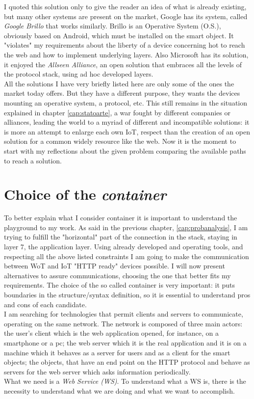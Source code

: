 I quoted this solution only to give the reader an idea of what is already existing, but many other systems are present on the market, Google has its system, called \textit{Google Brillo} that works similarly. Brillo is an Operative System (O.S.), obviously based on Android, which must be installed on the smart object. It "violates" my requirements about the liberty of a device concerning hot to reach the web and how to implement underlying layers. Also Microsoft has its solution, it enjoyed the \textit{Allseen Alliance}, an open solution that embraces all the levels of the protocol stack, using ad hoc developed layers. \\
All the solutions I have very briefly listed here are only some of the ones the market today offers. But they have a different purpose, they wants the devices mounting an operative system, a protocol, etc. This still remains in the situation explained in chapter \ref{cap:statoarte}, a war fought by different companies or alliances, leading the world to a myriad of different and incompatible solutions: it is more an attempt to enlarge each own IoT, respect than the creation of an open solution for a common widely resource like the web. Now it is the moment to start with my reflections about the given problem comparing the available paths to reach a solution.  


\section{Choice of the \textit{container}}
To better explain what I consider container it is important to understand the playground to my work. As said in the previous chapter, \ref{cap:probanalysis}, I am trying to fulfill the "horizontal" part of the connection in the stack, staying in layer 7, the application layer. Using already developed and operating tools, and respecting all the above listed constraints I am going to make the communication between WoT and IoT "HTTP ready" devices possible. I will now present alternatives to assure communications, choosing the one that better fits my requirements. The choice of the so called container is very important: it puts boundaries in the structure/syntax definition, so it is essential to understand pros and cons of each candidate. \\
I am searching for technologies that permit clients and servers to communicate, operating on the same network. The network is composed of three main actors: the user's client which is the web application opened, for instance, on a smartphone or a pc; the web server which it is the real application and it is on a machine which it behaves as a server for users and as a client for the smart objects; the objects, that have an end point on the HTTP protocol and behave as servers for the web server which asks information periodically. \\ 
What we need is a \textit{Web Service (WS)}. To understand what a WS is, there is the necessity to understand what we are doing and what we want to accomplish.

